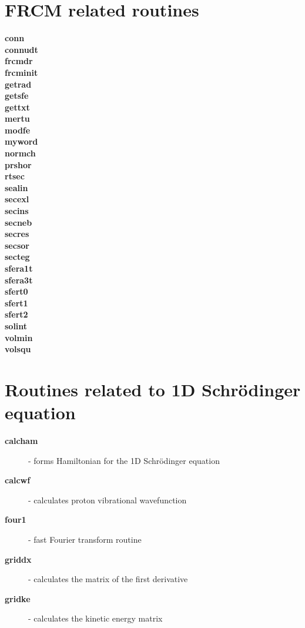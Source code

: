 \documentclass[oneside,11pt,openany]{book}
\newcommand{\tw}{\ttfamily}
\begin{document}
\section{FRCM related routines}
\begin{description}
\item[{\tw\bf conn}]
\item[{\tw\bf connudt}]
\item[{\tw\bf frcmdr}]
\item[{\tw\bf frcminit}]
\item[{\tw\bf getrad}]
\item[{\tw\bf getsfe}]
\item[{\tw\bf gettxt}]
\item[{\tw\bf mertu}]
\item[{\tw\bf modfe}]
\item[{\tw\bf myword}]
\item[{\tw\bf normch}]
\item[{\tw\bf prshor}]
\item[{\tw\bf rtsec}]
\item[{\tw\bf sealin}]
\item[{\tw\bf secexl}]
\item[{\tw\bf secins}]
\item[{\tw\bf secneb}]
\item[{\tw\bf secres}]
\item[{\tw\bf secsor}]
\item[{\tw\bf secteg}]
\item[{\tw\bf sfera1t}]
\item[{\tw\bf sfera3t}]
\item[{\tw\bf sfert0}]
\item[{\tw\bf sfert1}]
\item[{\tw\bf sfert2}]
\item[{\tw\bf solint}]
\item[{\tw\bf volmin}]
\item[{\tw\bf volsqu}]
\end{description}


\section{Routines related to 1D Schr\"odinger equation}
\begin{description}
\item[{\tw\bf calcham}] - forms Hamiltonian for the 1D Schr\"odinger equation
\item[{\tw\bf calcwf}] - calculates proton vibrational wavefunction
\item[{\tw\bf four1}] - fast Fourier transform routine
\item[{\tw\bf griddx}] - calculates the matrix of the first derivative
\item[{\tw\bf gridke}] - calculates the kinetic energy matrix
\end{description}
\end{document}
